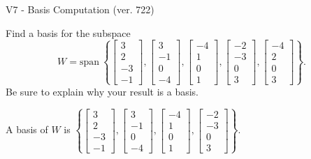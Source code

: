 \begin{exercise}
  \begin{exerciseTitle}V7 - Basis Computation (ver. 722)\end{exerciseTitle}
  \begin{exerciseStatement}
    Find a basis for the subspace 
\[W=\mathrm{span}\ \left\{\left[\begin{array}{r}
3 \\
2 \\
-3 \\
-1
\end{array}\right] , \left[\begin{array}{r}
3 \\
-1 \\
0 \\
-4
\end{array}\right] , \left[\begin{array}{r}
-4 \\
1 \\
0 \\
1
\end{array}\right] , \left[\begin{array}{r}
-2 \\
-3 \\
0 \\
3
\end{array}\right] , \left[\begin{array}{r}
-4 \\
2 \\
0 \\
3
\end{array}\right]\right\}.\]
 Be sure to explain why your result is a basis.


  \end{exerciseStatement}
  \begin{exerciseAnswer}
   A basis of \(W\) is  \(\left\{\left[\begin{array}{r}
3 \\
2 \\
-3 \\
-1
\end{array}\right] , \left[\begin{array}{r}
3 \\
-1 \\
0 \\
-4
\end{array}\right] , \left[\begin{array}{r}
-4 \\
1 \\
0 \\
1
\end{array}\right] , \left[\begin{array}{r}
-2 \\
-3 \\
0 \\
3
\end{array}\right]\right\}\).
  


  \end{exerciseAnswer}
\end{exercise}